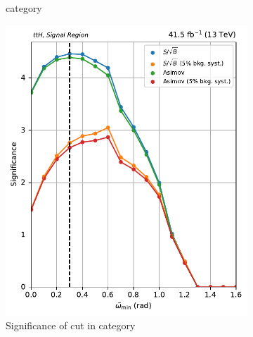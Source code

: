 \begin{figure}[htbp]
\begin{subfigure}[b]{0.27\textwidth}
        \caption{\ggH category}
    \end{subfigure}

    \begin{subfigure}[b]{0.27\textwidth}
        \includegraphics[width=\textwidth]{figures/category_optimisations/with_mindphi_cut/significance_ttH_min_omega_tilde_all.pdf}
        \caption{Significance of cut in \ttH category}
    \end{subfigure}
    \hfill
    \begin{subfigure}[b]{0.27\textwidth}

\end{subfigure}
\end{figure}
